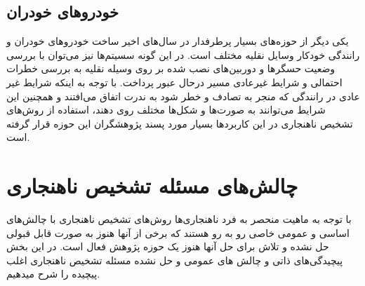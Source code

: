 \documentclass[12pt,a4paper]{report}
\theoremstyle{definition}
\theoremstyle{definition}
\begin{document}
\subsection{خودرو‌های خودران}
یکی دیگر از حوزه‌های بسیار پرطرفدار در سال‌های اخیر ساخت خودرو‌های خودران و رانندگی خودکار وسایل نقلیه مختلف است. در این گونه سسیتم‌ها نیز می‌توان با بررسی وضعیت حسگر‌ها و دوربین‌های نصب شده بر روی وسیله نقلیه به بررسی خطرات احتمالی و شرایط غیرعادی مسیر درحال عبور پرداخت. با توجه به اینکه شرایط غیر عادی در رانندگی که منجر به تصادف و خطر شود به ندرت اتفاق می‌افتند و همچنین این شرایط می‌توانند به صورت‌ها و شکل‌ها مختلف روی دهند، استفاده از روش‌های تشخیص ناهنجاری در این کاربردها بسیار مورد پسند پژوهشگران این حوزه قرار گرفته است.

\section{چالش‌‌های مسئله تشخیص ناهنجاری}

با توجه به ماهیت منحصر به فرد ناهنجاری‌ها روش‌های تشخیص ناهنجاری با چالش‌های اساسی و عمومی خاصی رو به رو هستند که برخی از آنها هنوز به صورت قابل قبولی حل نشده و تلاش برای حل آنها هنوز یک حوزه پژوهش فعال است. در این بخش پیچیدگی‌های ذاتی و چالش های عمومی و حل نشده مسئله تشخیص ناهنجاری اغلب پیچیده را شرح میدهیم. 
\end{document}
